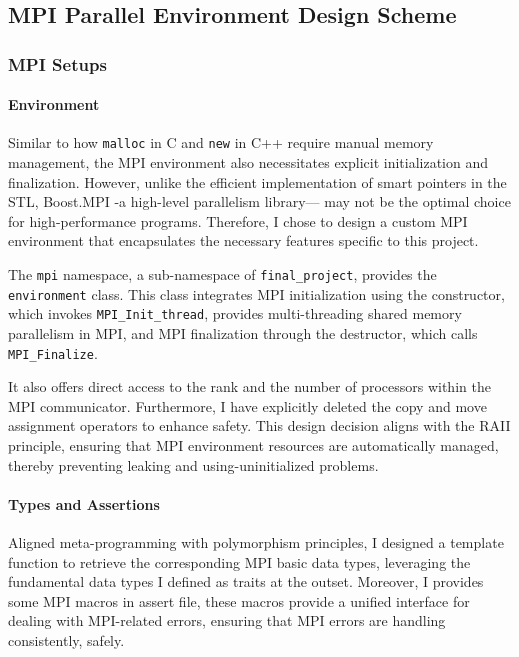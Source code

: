 \subsection{MPI Parallel Environment Design Scheme}
\subsubsection{MPI Setups}
\paragraph{Environment}
Similar to how \texttt{malloc} in C and \texttt{new} in C++ require manual memory management, 
the MPI environment also necessitates explicit initialization and finalization. 
However, unlike the efficient implementation of smart pointers in the STL, 
Boost.MPI\cite{BOOST_MPI}
-a high-level parallelism library—
may not be the optimal choice for high-performance programs. 
Therefore, I chose to design a custom MPI environment that encapsulates the necessary features specific to this project.

The \texttt{mpi} namespace, a sub-namespace of \texttt{final\_project}, provides the \texttt{environment} class. 
This class integrates MPI initialization using the constructor, which invokes \texttt{MPI\_Init\_thread},
provides multi-threading shared memory parallelism in MPI, 
and MPI finalization through the destructor, which calls \texttt{MPI\_Finalize}.

It also offers direct access to the rank and the number of processors within the MPI communicator.
Furthermore, I have explicitly deleted the copy and move assignment operators to enhance safety. 
This design decision aligns with the RAII principle, 
ensuring that MPI environment resources are automatically managed, thereby preventing leaking and 
using-uninitialized problems.

\paragraph{Types and Assertions} 
Aligned meta-programming with polymorphism principles, 
I designed a template function to retrieve the corresponding MPI basic data types, 
leveraging the fundamental data types I defined as traits at the outset.
Moreover, I provides some MPI macros in assert file, 
these macros provide a unified interface for dealing with MPI-related errors,
ensuring that MPI errors are handling consistently, safely. 

